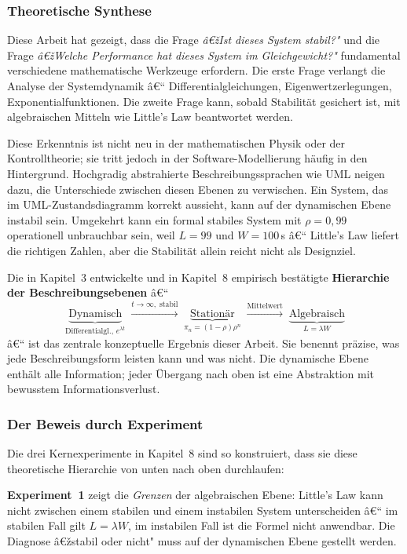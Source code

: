 ﻿\documentclass[a4paper,12pt]{scrreprt}
\theoremstyle{definition}
\begin{document}
\subsubsection{Theoretische Synthese}

Diese Arbeit hat gezeigt, dass die Frage \emph{â€žIst dieses System stabil?"}
und die Frage \emph{â€žWelche Performance hat dieses System im Gleichgewicht?"}
fundamental verschiedene mathematische Werkzeuge erfordern.  Die erste Frage
verlangt die Analyse der Systemdynamik â€“ Differentialgleichungen,
Eigenwertzerlegungen, Exponentialfunktionen.  Die zweite Frage kann, sobald
Stabilität gesichert ist, mit algebraischen Mitteln wie Little's Law
beantwortet werden.

Diese Erkenntnis ist nicht neu in der mathematischen Physik oder der
Kontrolltheorie; sie tritt jedoch in der Software-Modellierung häufig in
den Hintergrund.  Hochgradig abstrahierte Beschreibungssprachen wie UML
neigen dazu, die Unterschiede zwischen diesen Ebenen zu verwischen.
Ein System, das im UML-Zustandsdiagramm korrekt aussieht, kann auf der
dynamischen Ebene instabil sein.  Umgekehrt kann ein formal stabiles System
mit $\rho = 0{,}99$ operationell unbrauchbar sein, weil $L = 99$ und
$W = 100$\,s â€“ Little's Law liefert die richtigen Zahlen, aber die Stabilität
allein reicht nicht als Designziel.

Die in Kapitel~3 entwickelte und in Kapitel~8 empirisch bestätigte
\textbf{Hierarchie der Beschreibungsebenen} â€“
\[
\underbrace{\text{Dynamisch}}_{\text{Differentialgl., } e^{\lambda t}}
\;\xrightarrow{t \to \infty,\;\text{stabil}}\;
\underbrace{\text{Stationär}}_{\pi_n = (1-\rho)\rho^n}
\;\xrightarrow{\text{Mittelwert}}\;
\underbrace{\text{Algebraisch}}_{L = \lambda W}
\]
â€“ ist das zentrale konzeptuelle Ergebnis dieser Arbeit.  Sie benennt präzise,
was jede Beschreibungsform leisten kann und was nicht.  Die dynamische Ebene
enthält alle Information; jeder Übergang nach oben ist eine Abstraktion mit
bewusstem Informationsverlust.

\subsubsection{Der Beweis durch Experiment}

Die drei Kernexperimente in Kapitel~8 sind so konstruiert, dass sie
diese theoretische Hierarchie von unten nach oben durchlaufen:

\textbf{Experiment~1} zeigt die \emph{Grenzen} der algebraischen Ebene:
Little's Law kann nicht zwischen einem stabilen und einem instabilen System
unterscheiden â€“ im stabilen Fall gilt $L = \lambda W$, im instabilen Fall
ist die Formel nicht anwendbar.  Die Diagnose â€žstabil oder nicht" muss auf
der dynamischen Ebene gestellt werden.
\end{document}
